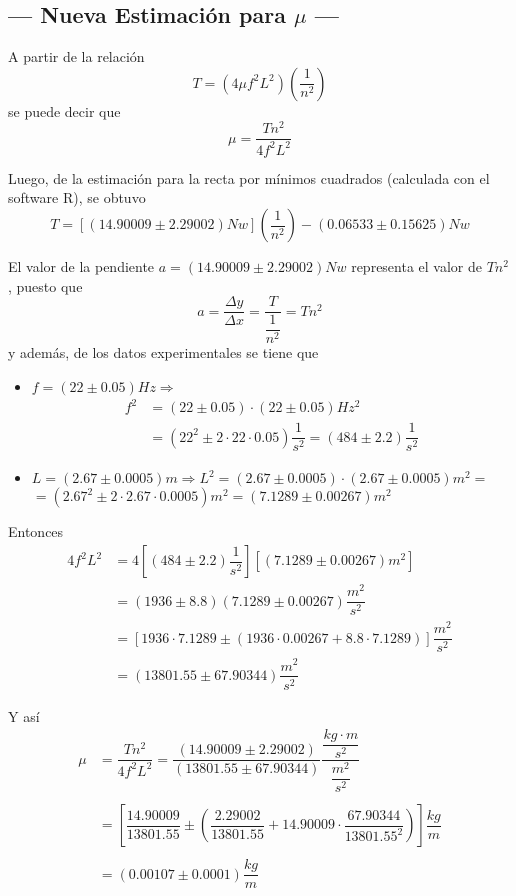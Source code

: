 \documentclass[a4paper, 10pt]{article}
\begin{document}
 	\subsection{--- Nueva Estimación para $ \mu $ ---}
 	
 	A partir de la relación 
 	$$T=\left(4\mu f^2 L^2\right)\left(\dfrac{1}{n^2}\right)$$
 	se puede decir que
 	$$\mu=\dfrac{Tn^2}{4f^2L^2}$$
 	
 	Luego, de la estimación para la recta por mínimos cuadrados (calculada con el software R), se obtuvo 
 	$$ T=[(14.90009\pm 2.29002) Nw]\left(\dfrac{1}{n^2}\right)-(0.06533\pm 0.15625) Nw $$
 	
 	El valor de la pendiente $a=(14.90009\pm 2.29002) Nw$ representa el valor de $ Tn^2 $, puesto que
 	$$a=\dfrac{\Delta y}{\Delta x}=\dfrac{T}{\dfrac{1}{n^2}}=Tn^2$$ 
 	y además, de los datos experimentales se tiene que
 	\begin{itemize}
 		\item[] $f=(22\pm0.05)Hz\Longrightarrow$
 		\begin{align*}
 			f^2&=(22\pm0.05)\cdot(22\pm0.05)Hz^2\\
 			&=(22^2\pm2\cdot22\cdot0.05)\dfrac{1}{s^2}=(484\pm2.2)\dfrac{1}{s^2}
 		\end{align*}
 		 
 		
 		\item[]$L=(2.67\pm0.0005)m\Longrightarrow L^2=(2.67\pm0.0005)\cdot(2.67\pm0.0005)m^2=$\\
 		\hspace{5cm}$=(2.67^2\pm2\cdot2.67\cdot0.0005)m^2=(7.1289\pm0.00267)m^2$
 	\end{itemize}
 	
 	Entonces
 	\begin{align*}
 		4f^2L^2&=4\left[(484\pm2.2)\dfrac{1}{s^2}\right]\left[(7.1289\pm0.00267)m^2\right]\\
 		&=(1936\pm8.8)(7.1289\pm0.00267)\dfrac{m^2}{s^2}\\
 		&=[1936\cdot7.1289\pm(1936\cdot0.00267+8.8\cdot7.1289)]\dfrac{m^2}{s^2}\\
 		&=(13801.55\pm 67.90344)\dfrac{m^2}{s^2}
 	\end{align*}
 
 	Y así
 	\begin{align*}
 		\mu&=\dfrac{Tn^2}{4f^2L^2}=\dfrac{(14.90009\pm 2.29002)}{(13801.55\pm 67.90344)}\dfrac{\dfrac{kg\cdot m}{s^2}}{\dfrac{m^2}{s^2}}\\\\
 		&=\left[\dfrac{14.90009}{13801.55}\pm\left(\dfrac{2.29002}{13801.55}+14.90009\cdot\dfrac{67.90344}{13801.55^2}\right)\right]\dfrac{kg}{m}\\\\
 		&=(0.00107\pm0.0001)\dfrac{kg}{m}
 	\end{align*}
\end{document}
